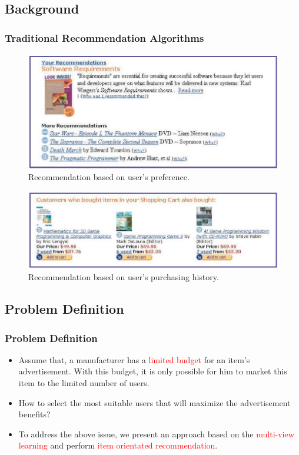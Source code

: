 \documentclass{beamer}
\newcommand{\red}[1]{\textcolor{red}{#1}}%
\begin{document}
\subsection{Background}
\begin{frame}
\frametitle{Traditional Recommendation Algorithms}

\begin{figure}[!t]
\renewcommand{\subfigcapskip}{-4pt}
\renewcommand{\subfigbottomskip}{0pt}
\centering
\includegraphics[width=0.6\linewidth]{Figures/Recommendation}
\caption{Recommendation based on user's preference.}
\label{fig:Recommendation}
\end{figure}

\begin{figure}[!t]
\renewcommand{\subfigcapskip}{-4pt}
\renewcommand{\subfigbottomskip}{0pt}
\centering
\includegraphics[width=0.6\linewidth]{Figures/Recommendation1}
\caption{Recommendation based on user's purchasing history.}
\label{fig:Recommendation1}
\end{figure}
\end{frame}
\subsection{Problem Definition}
\begin{frame}
\frametitle{Problem Definition}
\begin{itemize}
\item Assume that, a manufacturer has a \red{limited budget} for an item's advertisement. With this budget, it is only possible for him to market this item to the limited number of users.
\vskip 0.4in
\item How to select the most suitable users that will maximize the advertisement benefits?
\vskip 0.4in
\item To address the above issue, we present an approach based on the \red{multi-view learning} and perform \red{item orientated recommendation}.
\end{itemize}
\end{frame}
\end{document}
